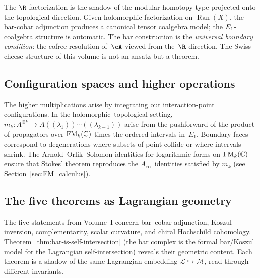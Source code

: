 \begin{remark}
\label{princ:R-shadow}
The $\R$-factorization is the shadow of the modular homotopy type
projected onto the topological direction. Given holomorphic
factorization on $\operatorname{Ran}(X)$, the bar-cobar
adjunction produces a canonical tensor coalgebra model; the
$E_1$-coalgebra structure is automatic. The bar construction
is the \emph{universal boundary condition}: the cofree resolution
of~$\cA$ viewed from the~$\R$-direction. The
Swiss-cheese structure of this volume is not an ansatz but a theorem.
\end{remark}

\subsection{Configuration spaces and higher operations}
\label{subsec:FM-higher-ops}
The higher multiplications arise by integrating out interaction-point
configurations. In the holomorphic--topological setting,
\(
m_k: A^{\otimes k}\to A((\lambda_1))\cdots((\lambda_{k-1}))
\)
arise from the pushforward of the product of propagators over $\mathrm{FM}_k(\mathbb C)$ times
the ordered intervals in~$E_1$.
Boundary faces correspond to degenerations where subsets of point collide or where intervals
shrink. The Arnold--Orlik--Solomon identities for logarithmic forms on $\mathrm{FM}_k(\mathbb C)$
ensure that Stokes' theorem reproduces the $A_\infty$~identities satisfied by $m_k$
(see Section~\ref{sec:FM_calculus}).

\subsection{The five theorems as Lagrangian geometry}
\label{subsec:five-theorems-lagrangian}

\providecommand{\cL}{\mathcal L}
\providecommand{\cM}{\mathcal M}
\providecommand{\HH}{\operatorname{HH}}
\providecommand{\Steinb}{\mathfrak{S}}

The five statements from Volume~I concern bar--cobar adjunction,
Koszul inversion, complementarity, scalar curvature, and chiral
Hochschild cohomology.
Theorem~\ref{thm:bar-is-self-intersection} (the bar complex is the
formal bar/Koszul model for the Lagrangian self-intersection)
reveals their geometric content.
Each theorem is a shadow of the same Lagrangian embedding
$\cL \hookrightarrow \cM$, read through different invariants.

